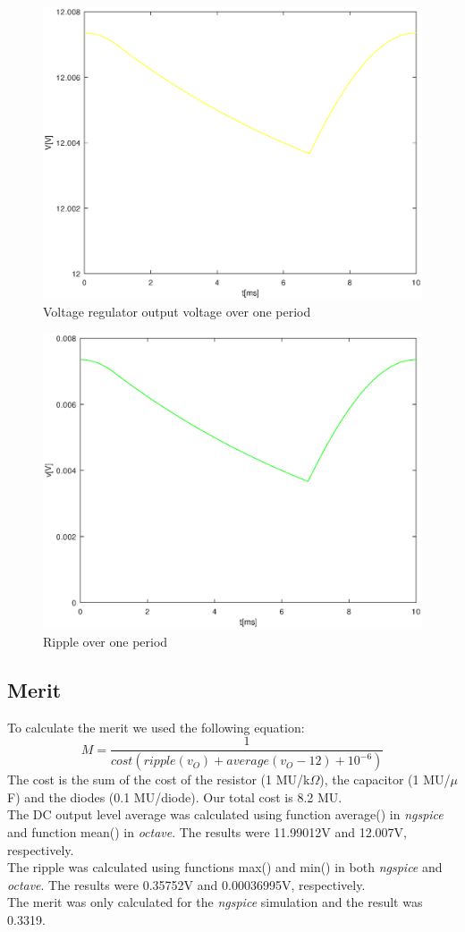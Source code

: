 \begin{figure}[H] \centering
\includegraphics[width=0.4\linewidth]{vregulator.eps}
\caption{Voltage regulator output voltage over one period}
\label{fig:voreg}
\end{figure}

\begin{figure}[H] \centering
\includegraphics[width=0.4\linewidth]{vfinal.eps}
\caption{Ripple over one period}
\label{fig:vofinal}
\end{figure}

\subsection{Merit}
To calculate the merit we used the following equation:
\begin{equation}
M = \frac{1}{cost(ripple(v_O) + average(v_O - 12) + 10^{-6})}
\end{equation}
The cost is the sum of the cost of the resistor (1 MU/k$\Omega$), the capacitor (1 MU/$\mu$F) and the diodes (0.1 MU/diode). Our total cost is 8.2 MU.\\
The DC output level average was calculated using function average() in \textit{ngspice} and function mean() in \textit{octave}. The results were 11.99012V and 12.007V, respectively.\\
The ripple was calculated using functions max() and min() in both \textit{ngspice} and \textit{octave}. The results were 0.35752V and 0.00036995V, respectively.\\
The merit was only calculated for the \textit{ngspice} simulation and the result was 0.3319.
